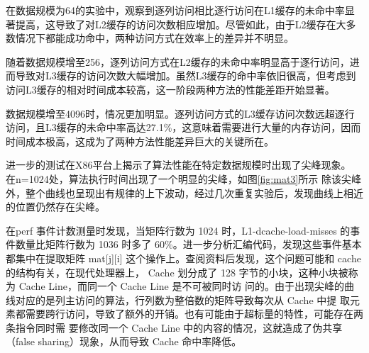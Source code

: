 \documentclass[a4paper]{article}
\begin{document}
在数据规模为64的实验中，观察到逐列访问相比逐行访问在L1缓存的未命中率显著提高，这导致了对L2缓存的访问次数相应增加。尽管如此，由于L2缓存在大多数情况下都能成功命中，两种访问方式在效率上的差异并不明显。

随着数据规模增至256，逐列访问方式在L2缓存的未命中率明显高于逐行访问，进而导致对L3缓存的访问次数大幅增加。虽然L3缓存的命中率依旧很高，但考虑到访问L3缓存的相对时间成本较高，这一阶段两种方法的性能差距开始显著。

数据规模增至4096时，情况更加明显。逐列访问方式的L3缓存访问次数远超逐行访问，且L3缓存的未命中率高达27.1\%，这意味着需要进行大量的内存访问，因而时间成本极高，这成为了两种方法性能差异巨大的关键所在。
                
                进一步的测试在X86平台上揭示了算法性能在特定数据规模时出现了尖峰现象。
                在n=1024处，算法执行时间出现了一个明显的尖峰，如图\ref{fig:mat3}所示
                除该尖峰外，整个曲线也呈现出有规律的上下波动，经过几次重复实验后，发现曲线上相近的位置仍然存在尖峰。
                  \begin{figure}[!htbp]
                    \centering
                    \centering
                    \caption{}
                    \label{fig:cache_line}
                \end{figure}
                在perf 事件计数测量时发现，当矩阵行数为 1024 时，L1-dcache-load-misses 的事
                件数量比矩阵行数为 1036 时多了 60\%。进一步分析汇编代码，发现这些事件基本都集中在提取矩阵
                mat[j][i] 这个操作上。查阅资料后发现，这个问题可能和 cache 的结构有关，在现代处理器上，
                Cache 划分成了 128 字节的小块，这种小块被称为 Cache Line，而同一个 Cache Line 是不可被同时访
                问的。由于出现尖峰的曲线对应的是列主访问的算法，行列数为整倍数的矩阵导致每次从 Cache 中提
                取元素都需要跨行访问，导致了额外的开销。也有可能由于超标量的特性，可能存在两条指令同时需
                要修改同一个 Cache Line 中的内容的情况，这就造成了伪共享（false sharing）现象，从而导致 Cache
                命中率降低。
\end{document}
